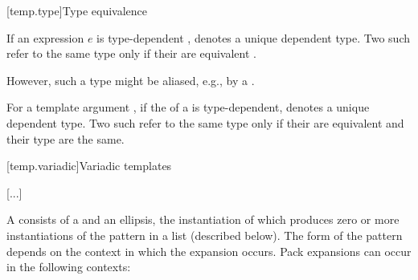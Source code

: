 \documentclass{wg21}
\begin{document}
%
%
\begin{bnf}
    \br
    \br
    \br
\end{bnf}


[temp.type]{Type equivalence}

\pnum
If an expression $e$ is type-dependent ,
denotes a unique dependent type. Two such 
refer to the same type only if their  are
equivalent .
\begin{note} %
    However, such a type might be aliased,
    e.g., by a .
\end{note}

\begin{addedblock}
For a template argument , if the  of a  is type-dependent,
 denotes a unique dependent type.
Two such  refer to the same type only if their  are
equivalent  and their type are the same. %
\end{addedblock}

[temp.variadic]{Variadic templates}

\textcolor{noteclr}{[...]}

\pnum
{}%
A 
consists of a  and an ellipsis, the instantiation of which
produces zero or more instantiations of the pattern in a list (described below).
The form of the pattern
depends on the context in which the expansion occurs. Pack
expansions can occur in the following contexts:
\end{document}
